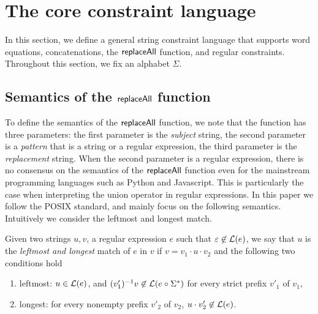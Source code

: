 
\section{The core constraint language}

In this section, we define a general string constraint language that supports word equations, concatenations, the $\mathsf{replaceAll}$ function, and regular constraints.  Throughout this section, we fix an alphabet $\Sigma$.



\subsection{Semantics of the $\mathsf{replaceAll}$ function}
To define the semantics of the $\mathsf{replaceAll}$ function, we note that the function has three parameters: the first parameter is the \emph{subject} string, the second parameter is a \emph{pattern} that is a string or a regular expression, the third parameter is the \emph{replacement} string.  
When the second parameter is a regular expression, there is no consensus on the semantics of the $\mathsf{replaceAll}$ function even for the mainstream programming languages such as Python and Javascript.
 This is particularly the case when interpreting the union operator in regular expressions. In this paper we follow the POSIX standard, and mainly focus on the following semantics. Intuitively we consider the leftmost and longest match. 


\begin{definition}
Given two strings $u,v$, a regular expression $e$ such that $\varepsilon \not \in \mathcal{L}(e)$, we say that $u$ is the \emph{leftmost and longest} match of $e$ in $v$ if $v=v_1\cdot u \cdot v_2$ and the following two conditions hold
\begin{enumerate}
	\item leftmost: $u \in \mathcal{L}(e)$,  and $(v'_1)^{-1} v \not \in  \mathcal{L}(e \circ \Sigma^\ast)$ for every strict prefix $v'_1$ of $v_1$, 
	\item longest: for every nonempty prefix $v'_2$ of $v_2$, $u \cdot v'_2 \not \in \mathcal{L}(e)$.
\end{enumerate} 
\end{definition}



